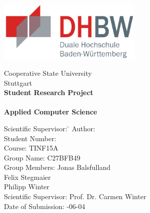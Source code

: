 \begin{titlepage}

%		
\begin{center}
        \v
		\includegraphics[width=7cm, keepaspectratio]{img/dhbw_logo.png}
\end{center}

\vspace{1em}

\sffamily
\begin{center}
	\textsf{\large{}Cooperative State University\\[1.5mm] Stuttgart}\\[2em] \vspace{1cm}
	\textsf{\textbf{\Large{}Student Research Project}}\\[3mm] \vspace{1cm}
	\textsf{\textbf{\dertitel}} \\[1.5cm]	\vspace{1cm}
	\textsf{\textbf{\Large{}Applied Computer Science}\\[3mm]}

	\vspace{2cm}
\vfill

\begin{minipage}{\textwidth}

\begin{tabbing}
	Scientific Supervisor: \hspace{1.85cm}\=\kill
	Author: \> \derautor \\[1.5mm]
	Student Number: \\[1.5mm]
	Course: \> TINF15A\\[1.5mm]
	Group Name: \> C27BFB49\\[1.5mm]
	Group Members: \> Jonas Balsfulland\\
	\> Felix Stegmaier\\
	\> Philipp Winter\\[1.5mm]
	Scientific Supervisor: \> Prof. Dr. Carmen Winter \\[1.5mm]
	Date of Submission: -06-04\\
\end{tabbing}
\end{minipage}

\end{center}

\end{titlepage}
